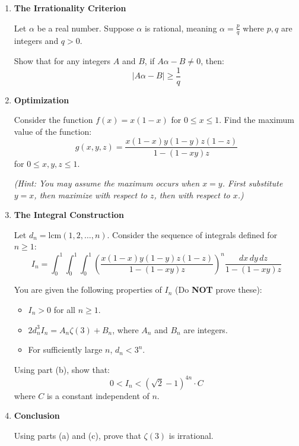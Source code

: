 \begin{enumerate}
    \item[(a)] \textbf{The Irrationality Criterion}
    
    Let $\alpha$ be a real number. Suppose $\alpha$ is rational, meaning $\alpha = \frac{p}{q}$ where $p, q$ are integers and $q > 0$.
    
    Show that for any integers $A$ and $B$, if $A\alpha - B \neq 0$, then:
    \[ |A\alpha - B| \ge \frac{1}{q} \]

    \item[(b)] \textbf{Optimization}
    
    Consider the function $f(x) = x(1-x)$ for $0 \le x \le 1$.
    Find the maximum value of the function:
    \[ g(x, y, z) = \frac{x(1-x)y(1-y)z(1-z)}{1 - (1-xy)z} \]
    for $0 \le x, y, z \le 1$.
    
    \textit{(Hint: You may assume the maximum occurs when $x=y$. First substitute $y=x$, then maximize with respect to $z$, then with respect to $x$.)}

    \item[(c)] \textbf{The Integral Construction}
    
    Let $d_n = \text{lcm}(1, 2, \dots, n)$.
    Consider the sequence of integrals defined for $n \ge 1$:
    \[ I_n = \int_0^1 \int_0^1 \int_0^1 \left( \frac{x(1-x)y(1-y)z(1-z)}{1 - (1-xy)z} \right)^n \frac{dx \, dy \, dz}{1 - (1-xy)z} \]
    
    You are given the following properties of $I_n$ (Do \textbf{NOT} prove these):
    \begin{itemize}
        \item[(1)] $I_n > 0$ for all $n \ge 1$.
        \item[(2)] $2 d_n^3 I_n = A_n \zeta(3) + B_n$, where $A_n$ and $B_n$ are integers.
        \item[(3)] For sufficiently large $n$, $d_n < 3^n$.
    \end{itemize}
    
    Using part (b), show that:
    \[ 0 < I_n < (\sqrt{2}-1)^{4n} \cdot C \]
    where $C$ is a constant independent of $n$.

    \item[(d)] \textbf{Conclusion}
    
    Using parts (a) and (c), prove that $\zeta(3)$ is irrational.

\end{enumerate}
